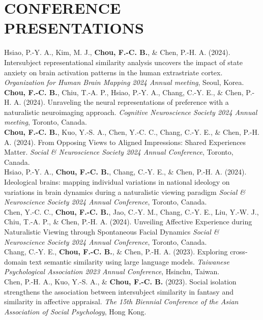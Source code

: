 \documentclass[a4paper,12pt]{article}
\newcommand{\itemspace}{7pt} %
\begin{document}
\section*{CONFERENCE PRESENTATIONS}
\noindent Hsiao, P.-Y. A., Kim, M. J., \textbf{Chou, F.-C. B.}, \& Chen, P.-H. A. (2024). Intersubject representational similarity analysis uncovers the impact of state anxiety on brain activation patterns in the human extrastriate cortex. \textit{Organization for Human Brain Mapping 2024 Annual meeting}, Seoul, Korea.\\[\itemspace]
\noindent \textbf{Chou, F.-C. B.}, Chiu, T.-A. P., Hsiao, P.-Y. A., Chang, C.-Y. E., \& Chen, P.-H. A. (2024). Unraveling the neural representations of preference with a naturalistic neuroimaging approach. \textit{Cognitive Neuroscience Society 2024 Annual meeting}, Toronto, Canada.\\[\itemspace]
\noindent\textbf{Chou, F.-C. B.}, Kuo, Y.-S. A., Chen, Y.-C. C., Chang, C.-Y. E., \& Chen, P.-H. A. (2024). From Opposing Views to Aligned Impressions: Shared Experiences Matter. \textit{Social \& Neuroscience Society 2024 Annual Conference}, Toronto, Canada. \\[\itemspace]
\noindent Hsiao, P.-Y. A., \textbf{Chou, F.-C. B.}, Chang, C.-Y. E., \& Chen, P.-H. A. (2024). Ideological brains: mapping individual variations in national ideology on variations in brain dynamics during a naturalistic viewing paradigm \textit{Social \& Neuroscience Society 2024 Annual Conference}, Toronto, Canada. \\[\itemspace]
\noindent Chen, Y.-C. C., \textbf{Chou, F.-C. B.}, Jao, C.-Y. M., Chang, C.-Y. E., Liu, Y.-W. J., Chiu, T.-A. P., \& Chen, P.-H. A. (2024). Unveiling Affective Experience during Naturalistic Viewing through Spontaneous Facial Dynamics \textit{Social \& Neuroscience Society 2024 Annual Conference}, Toronto, Canada. \\[\itemspace]
\noindent Chang, C.-Y. E., \textbf{Chou, F.-C. B.}, \& Chen, P.-H. A. (2023). Exploring cross-domain text semantic similarity using large language models. \textit{Taiwanese Psychological Association 2023 Annual Conference}, Hsinchu, Taiwan.\\[\itemspace]
\noindent Chen, P.-H. A., Kuo, Y.-S. A., \& \textbf{Chou, F.-C. B.} (2023). Social isolation strengthens the association between intersubject similarity in fantasy and similarity in affective appraisal. \textit{The 15th Biennial Conference of the Asian Association of Social Psychology}, Hong Kong.\\[\itemspace]
\end{document}
